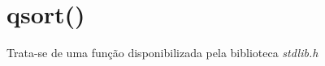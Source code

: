 \section{\normalsize qsort()}
	Trata-se de uma função disponibilizada pela biblioteca \textit{stdlib.h}